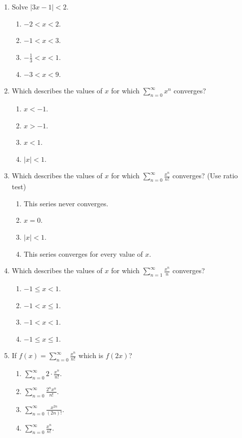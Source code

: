 \documentclass{article}
\begin{document}
\begin{enumerate}


  \item Solve $|3x-1|<2$.
  \begin{enumerate}
    \item $-2<x<2$.
    \item $-1<x<3$.
    \item $-\frac{1}{3}<x<1$.  %
    \item $-3<x<9$.
  \end{enumerate}
  
  
  \item Which describes the values of $x$ for which $\sum_{n=0}^\infty x^n$ converges?
  \begin{enumerate}
    \item $x<-1$.
    \item $x>-1$.
    \item $x<1$.  
    \item $|x|<1$. %
  \end{enumerate}
  
  
  \item Which describes the values of $x$ for which $\sum_{n=0}^\infty \frac{x^n}{n!}$ converges?  (Use ratio test)
  \begin{enumerate}
    \item This series never converges.
    \item $x=0$.
    \item $|x|<1$.
    \item This series converges for every value of $x$. %
  \end{enumerate}
  
  
  \item Which describes the values of $x$ for which $\sum_{n=1}^\infty \frac{x^n}{n}$ converges? 
  \begin{enumerate}
    \item $-1\leq x < 1$. %
    \item $-1 < x \leq 1$.
    \item $-1<x<1$.
    \item $-1\leq x \leq 1$.
   
  \end{enumerate}
  
  
  \item If $f(x)=\sum_{n=0}^\infty \frac{x^n}{n!}$ which is $f(2x)$? 
  \begin{enumerate}
    \item $\sum_{n=0}^\infty 2\cdot \frac{x^n}{n!}$.
    \item $\sum_{n=0}^\infty \frac{2^n x^n}{n!}$. %
    \item $\sum_{n=0}^\infty \frac{x^{2n}}{(2n)!}$.
    \item $\sum_{n=0}^\infty \frac{x^n}{n!}$.
   

\end{enumerate}
\end{enumerate}
\end{document}
